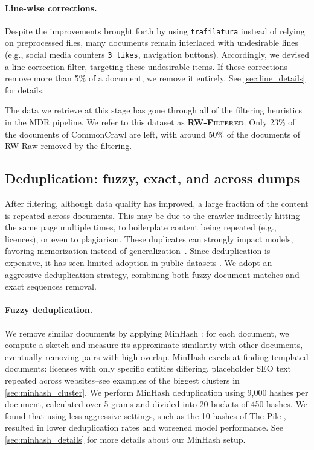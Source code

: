 \paragraph{Line-wise corrections.} Despite the improvements brought forth by using \texttt{trafilatura} instead of relying on preprocessed files, many documents remain interlaced with undesirable lines (e.g., social media counters {\small \texttt{3 likes}}, navigation buttons). Accordingly, we devised a line-correction filter, targeting these undesirable items. If these corrections remove more than 5\% of a document, we remove it entirely.  See \ref{sec:line_details} for details.

The data we retrieve at this stage has gone through all of the filtering heuristics in the MDR pipeline. We refer to this dataset as \textcolor{rw_filtered}{\textsc{\textbf{RW-Filtered}}}. Only 23\% of the documents of CommonCrawl are left, with around 50\% of the documents of RW-Raw removed by the filtering.

\subsection{Deduplication: fuzzy, exact, and across dumps}
\label{sec:dedup_mdr}

After filtering, although data quality has improved, a large fraction of the content is repeated across documents. This may be due to the crawler indirectly hitting the same page multiple times, to boilerplate content being repeated (e.g., licences), or even to plagiarism. These duplicates can strongly impact models, favoring memorization instead of generalization~\cite{lee2022deduplicating, hernandez2022scaling}. Since deduplication is expensive, it has seen limited adoption in public datasets \cite{OrtizSuarezSagotRomary2019, 2020t5}. We adopt an aggressive deduplication strategy, combining both fuzzy document matches and exact sequences removal.

\paragraph{Fuzzy deduplication.} We remove similar documents by applying MinHash \cite{broder1997resemblance}: for each document, we compute a sketch and measure its approximate similarity with other documents, eventually removing pairs with high overlap. MinHash excels at finding templated documents: licenses with only specific entities differing, placeholder SEO text repeated across websites--see examples of the biggest clusters in \ref{sec:minhash_cluster}. We perform MinHash deduplication using 9,000 hashes per document, calculated over 5-grams and divided into 20 buckets of 450 hashes. We found that using less aggressive settings, such as the 10 hashes of The Pile \cite{gao2020pile}, resulted in lower deduplication rates and worsened model performance. See \ref{sec:minhash_details} for more details about our MinHash setup.  

